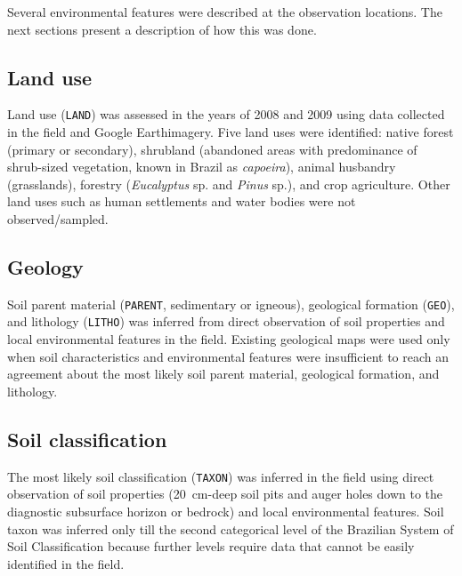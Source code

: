 Several environmental features were described at the observation locations. The next sections 
present a description of how this was done.

\tocless\subsection{Land use}

Land use (\texttt{LAND}) was assessed in the years of \num{2008} and \num{2009} using data 
collected in the field and Google Earth\textregistered imagery. Five land uses were identified: 
native forest (primary or secondary), shrubland (abandoned areas with predominance of shrub-sized 
vegetation, known in Brazil as \emph{capoeira}), animal husbandry (grasslands), forestry 
(\textit{Eucalyptus} sp. and \textit{Pinus} sp.), and crop agriculture. Other land uses such as 
human settlements and water bodies were not observed/sampled.

\tocless\subsection{Geology}

Soil parent material (\texttt{PARENT}, sedimentary or igneous), geological formation (\texttt{GEO}),
and lithology (\texttt{LITHO}) was inferred from direct observation of soil properties and local 
environmental features in the field. Existing geological maps were used only when soil 
characteristics and environmental features were insufficient to reach an agreement about the most 
likely soil parent material, geological formation, and lithology.

\tocless\subsection{Soil classification}

The most likely soil classification (\texttt{TAXON}) was inferred in the field using direct 
observation of soil properties (\SI{20}{\centi\metre}-deep soil pits and auger holes down to the 
diagnostic subsurface horizon or bedrock) and local environmental features. Soil taxon was inferred 
only till the second categorical level of the Brazilian System of Soil Classification 
\cite{SantosEtAl2013a} because further levels require data that cannot be easily identified in the 
field.


